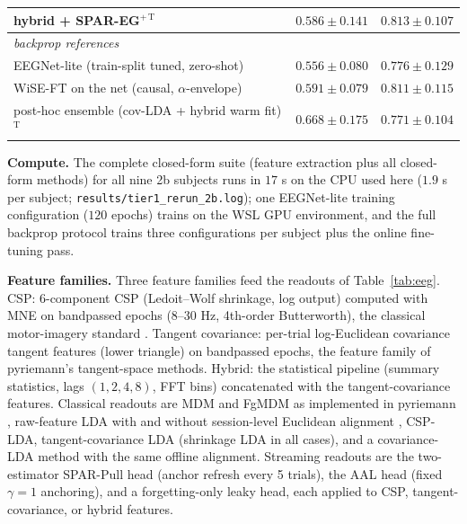 \begin{table}[h]
\begin{tabular}{lcc}
hybrid + SPAR-EG$^{+\,{\mathrm{T}}}$ & $0.586 \pm 0.141$ & $0.813 \pm 0.107$ \\
\midrule
\multicolumn{3}{l}{\emph{backprop references}}\\
EEGNet-lite (train-split tuned, zero-shot) & $0.556 \pm 0.080$ & $0.776 \pm 0.129$ \\
WiSE-FT on the net (causal, $\alpha$-envelope) & $0.591 \pm 0.079$ & $0.811 \pm 0.115$ \\
\midrule
post-hoc ensemble (cov-LDA + hybrid warm fit)$^{\mathrm{T}}$ & $\mathbf{0.668 \pm 0.175}$ & $0.771 \pm 0.104$ \\
\bottomrule
\end{tabular}
\end{table}

\textbf{Compute.}
The complete closed-form suite (feature extraction plus all closed-form methods) for all nine 2b subjects runs in $17$ s on the CPU used here ($1.9$ s per subject; \texttt{results/tier1\_rerun\_2b.log}); one EEGNet-lite training configuration ($120$ epochs) trains on the WSL GPU environment, and the full backprop protocol trains three configurations per subject plus the online fine-tuning pass.

\textbf{Feature families.}
Three feature families feed the readouts of Table~\ref{tab:eeg}.
CSP: 6-component CSP (Ledoit--Wolf shrinkage, log output) computed with MNE \citep{gramfort2013mne} on bandpassed epochs (8--30 Hz, 4th-order Butterworth), the classical motor-imagery standard \citep{ramoser2000csp}.
Tangent covariance: per-trial log-Euclidean covariance tangent features (lower triangle) on bandpassed epochs, the feature family of pyriemann's tangent-space methods.
Hybrid: the statistical pipeline (summary statistics, lags $(1, 2, 4, 8)$, FFT bins) concatenated with the tangent-covariance features.
Classical readouts are MDM and FgMDM as implemented in pyriemann \citep{barachant2020pyriemann}, raw-feature LDA with and without session-level Euclidean alignment \citep{he2020ea}, CSP-LDA, tangent-covariance LDA (shrinkage LDA in all cases), and a covariance-LDA method with the same offline alignment.
Streaming readouts are the two-estimator SPAR-Pull head (anchor refresh every 5 trials), the AAL head (fixed $\gamma = 1$ anchoring), and a forgetting-only leaky head, each applied to CSP, tangent-covariance, or hybrid features.

